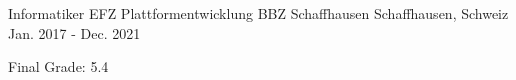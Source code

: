 

\begin{cventries}
  \cventry
    {Informatiker EFZ Plattformentwicklung} %
    {BBZ Schaffhausen} %
    {Schaffhausen, Schweiz} %
    {Jan. 2017 - Dec. 2021} %
    {
      \begin{cvitems}
        \item {Final Grade: 5.4}
      \end{cvitems}
    }
\end{cventries}

